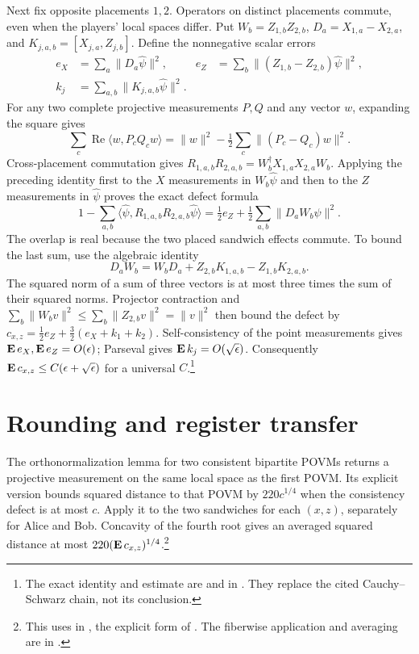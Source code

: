 \documentclass[11pt]{article}
\begin{document}
Next fix opposite placements $1,2$.  Operators on distinct placements
commute, even when the players' local spaces differ.  Put
$W_b=Z_{1,b}Z_{2,b}$, $D_a=X_{1,a}-X_{2,a}$, and
$K_{j,a,b}=[X_{j,a},Z_{j,b}]$.  Define the nonnegative scalar errors
\[
 \begin{aligned}
 e_X&=\sum_a\|D_a\hat\psi\|^2,&
 e_Z&=\sum_b\|(Z_{1,b}-Z_{2,b})\hat\psi\|^2,\\
 k_j&=\sum_{a,b}\|K_{j,a,b}\hat\psi\|^2.&
 \end{aligned}
\]
For any two complete projective measurements $P,Q$ and any vector $w$,
expanding the square gives
\[
 \sum_c\operatorname{Re}\langle w,P_cQ_cw\rangle
   =\|w\|^2-\tfrac12\sum_c\|(P_c-Q_c)w\|^2.
\]
Cross-placement commutation gives
$R_{1,a,b}R_{2,a,b}=W_b^\dagger X_{1,a}X_{2,a}W_b$.
Applying the preceding identity first to the $X$ measurements in $W_b\hat\psi$
and then to the $Z$ measurements in $\hat\psi$ proves the exact defect formula
\[
 1-\sum_{a,b}\langle\hat\psi,R_{1,a,b}R_{2,a,b}\hat\psi\rangle
   =\tfrac12 e_Z+\tfrac12\sum_{a,b}\|D_aW_b\hat\psi\|^2.
\]
The overlap is real because the two placed sandwich effects commute.
To bound the last sum, use the algebraic identity
\[
 D_aW_b=W_bD_a+Z_{2,b}K_{1,a,b}-Z_{1,b}K_{2,a,b}.
\]
The squared norm of a sum of three vectors is at most three times the sum
of their squared norms.  Projector contraction and
$\sum_b\|W_bv\|^2\leq\sum_b\|Z_{2,b}v\|^2=\|v\|^2$ then bound the defect by
$c_{x,z}=\tfrac12 e_Z+\tfrac32(e_X+k_1+k_2)$.
Self-consistency of the point measurements gives
$\mathop{\bf E\/} e_X,\mathop{\bf E\/} e_Z=O(\epsilon)$; Parseval gives $\mathop{\bf E\/} k_j=O(\sqrt{\epsilon})$.
Consequently $\mathop{\bf E\/} c_{x,z}\leq C(\epsilon+\sqrt{\epsilon})$ for a universal $C$.\footnote{
The exact identity and estimate are  and
 in
.
They replace the cited Cauchy--Schwarz chain, not its conclusion.}

\section{Rounding and register transfer}

The orthonormalization lemma for two consistent bipartite POVMs returns a
projective measurement on the same local space as the first POVM.
Its explicit version bounds squared distance to that POVM by $220c^{1/4}$
when the consistency defect is at most $c$.  Apply it to the two sandwiches
for each $(x,z)$, separately for Alice and Bob.  Concavity of the fourth root
gives an averaged squared distance at most
$220(\mathop{\bf E\/} c_{x,z})^{1/4}$.\footnote{This uses
 in
, the
explicit form of .  The fiberwise application and averaging
are in .}
\end{document}
